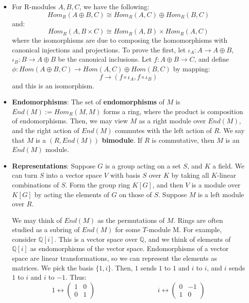 \documentclass[11pt, oneside]{amsart}   	%
\theoremstyle{definition}
\begin{document}
\begin{itemize}
	\item For R-modules $A, B, C$, we have the following:
	$$
		Hom_R(A\oplus B, C)\cong Hom_R(A, C)\oplus Hom_R(B, C)
	$$
	and:
	$$
		Hom_R(A, B\times C)\cong Hom_R(A, B)\times Hom_R(A, C)
	$$
	where the isomorphisms are due to composing the homomorphisms with canonical injections and projections. To prove the first, let $\iota_A : A
	\rightarrow A\oplus B$, $\iota_B : B\rightarrow A\oplus B$ be the canonical inclusions. Let $f: A\oplus B\rightarrow C$, and define $\phi : Hom(A\oplus 
	B, C)\rightarrow Hom(A, C)\oplus Hom(B, C)$ by mapping:
	$$
		f\rightarrow (f\circ\iota_A, f\circ\iota_B)
	$$
	and this is an isomorphism.
	
	\item \textbf{Endomorphisms}: The set of \textbf{endomorphisms} of $M$ is $End(M) := Hom_R(M, M)$ forms a ring, where the product is 
	composition of endomorphisms. Then, we may view $M$ as a right module over $End(M)$, and the right action of $End(M)$ commutes with the 
	left action of $R$. We say that $M$ is a \textbf{$(R, End(M))$ bimodule}. If $R$ is commutative, then $M$ is an $End(M)$ module.
	
	\item \textbf{Representations}: Suppose $G$ is a group acting on a set $S$, and $K$ a field. We can turn $S$ into a vector space $V$ with basis 
	$S$ over $K$ by taking all $K$-linear combinations of $S$. Form the group ring $K[G]$, and then $V$ is a module over $K[G]$ by acting the 
	elements of $G$ on those of $S$. Suppose $M$ is a left module over $R$. 
	
	We may think of $End(M)$ as the permutations of $M$. Rings are often studied as a subring of $End(M)$ for some $T$-module M. For example, 
	consider $\mathbb Q[i]$. This is a vector space over $\mathbb Q$, and we think of elements of $\mathbb Q[i]$ as endomorphisms of the vector 
	space. Endomorphisms of a vector space are linear transformations, so we can represent the elements as matrices. We pick the basis $\{1, i\}$. 
	Then, $1$ sends $1$ to $1$ and $i$ to $i$, and $i$ sends $1$ to $i$ and $i$ to $-1$. Thus:
	$$
		1\longleftrightarrow 
		\begin{pmatrix}
			1 & 0 \\ 0 & 1
		\end{pmatrix}
		\;\;\;\;\;\;\;\;\;\;\;\;\;\;\;\;\;\;\;\;\;\;\;\;\;\;\;\;\;\;\;\;\;
		i\longleftrightarrow
		\begin{pmatrix}
			0 & -1 \\ 1 & 0
		\end{pmatrix}
	$$
	

\end{itemize}
\end{document}
